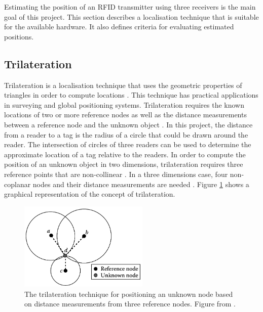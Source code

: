 Estimating the position of an RFID transmitter using three receivers is the main goal of this project. This section describes a localisation technique that is suitable for the available hardware. It also defines criteria for evaluating estimated positions. 

\subsection{Trilateration}

Trilateration is a localisation technique that uses the geometric properties of triangles in order to compute locations \cite{Hightower2001c}. This technique has practical applications in surveying and global positioning systems. Trilateration requires the known locations of two or more reference nodes as well as the distance measurements between a reference node and the unknown object \cite[p. 280]{Zhang2009}. In this project, the distance from a reader to a tag is the radius of a circle that could be drawn around the reader. The intersection of circles of three readers can be used to determine the approximate location of a tag relative to the readers. In order to compute the position of an unknown object in two dimensions, trilateration requires three reference points that are non-collinear \cite{Zhang2009}. In a three dimensions case, four non-coplanar nodes and their distance measurements are needed \cite{Hightower2001c}. Figure \ref{fig:trilat} shows  a graphical representation of the concept of trilateration.

\begin{figure}[h]
	\begin{center}
		\includegraphics[width=0.55\textwidth]{figures/trilat}
		\caption{The trilateration technique for positioning an unknown node based on distance measurements from three reference nodes. Figure from \cite[p. 281]{Zhang2009}.}
		\label{fig:trilat}
	\end{center}
\end{figure}


